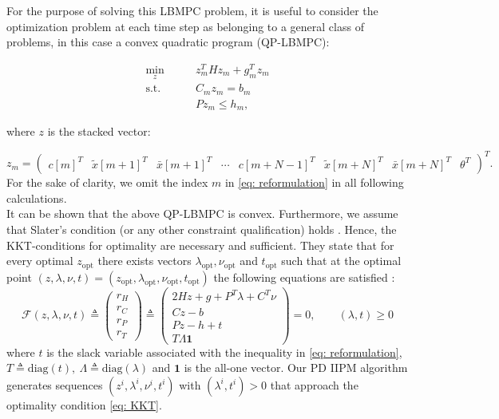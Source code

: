 \documentclass[letter]{article}
\begin{document}
\begin{sffamily}
\noindent
For the purpose of solving this LBMPC problem, it is useful to consider the optimization problem at each time step as belonging to a general class of problems, in this case a convex quadratic program (QP-LBMPC):

\begin{align}\label{eq: reformulation}
	 \min_{z} \qquad & z_m^T H z_m + g_m^T z_m  \\
	  \text{s.t.} \qquad & C_m z_m = b_m \nonumber \\
	 & P z_m \leq h_m, \nonumber 
\end{align}

\noindent
where $z$ is the stacked vector:

\begin{equation*}
	z_m = \begin{pmatrix}	
		c[m]^T & \tilde{x}[m+1]^T & \bar{x}[m+1]^T & \cdots & c[m+N-1]^T & \tilde{x}[m+N]^T & \bar{x}[m+N]^T & \theta^T	\end{pmatrix}^T.
\end{equation*}
For the sake of clarity, we omit the index $m$ in \eqref{eq: reformulation} in all following calculations.\\

\noindent
It can be shown that the above QP-LBMPC is convex. Furthermore, we assume that Slater's condition (or any other constraint qualification)  holds \citep[Ch. 2]{Borrelli2011Book}. Hence, the KKT-conditions for optimality are necessary and sufficient. They state that for every optimal $z_\text{opt}$ there exists vectors $\lambda_\text{opt}, \nu_\text{opt}$ and $t_\text{opt}$ such that at the optimal point $(z,\lambda,\nu,t)=(z_\text{opt},\lambda_\text{opt},\nu_\text{opt},t_\text{opt})$ the following equations are satisfied \citep{Nocedal2000NumOpt}:
\begin{equation}
\label{eq: KKT}
	\mathcal{F}(z,\lambda,\nu,t) \triangleq 
	\begin{pmatrix}
		r_H \\ r_C \\ r_P \\ r_T
	\end{pmatrix} \triangleq
	\begin{pmatrix}
		2Hz + g + P^T \lambda + C^T \nu \\
		Cz - b \\
		Pz-h+t \\
		T\Lambda\mathbf{1}
	\end{pmatrix} = 0,\qquad (\lambda, t) \geq 0
\end{equation}
where $t$ is the slack variable associated with the inequality in \eqref{eq: reformulation}, $T\triangleq\text{diag}(t),\ \Lambda\triangleq\text{diag}(\lambda)$ and $\mathbf{1}$ is the all-one vector. Our PD IIPM algorithm generates sequences $(z^i,\lambda^i,\nu^i,t^i)$ with $(\lambda^i,t^i)>0$ that approach the optimality condition \eqref{eq: KKT}. \\


\end{sffamily}
\end{document}
